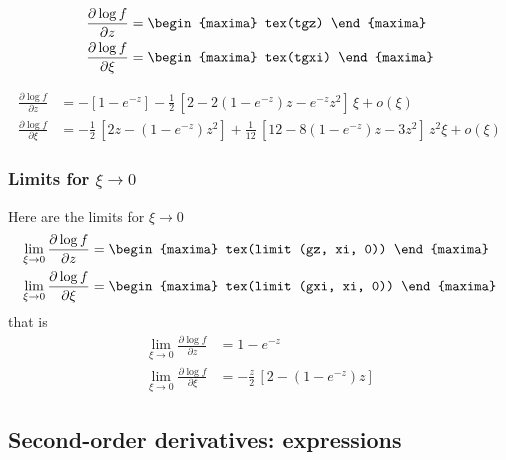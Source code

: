 {\color{MonVertF}
\begin{align*}
  \frac{\partial \log f}{\partial z} &= 
  \begin{maxima}
    tex(tgz)
  \end{maxima} \\
  \frac{\partial \log f}{\partial \xi} &= 
  \begin{maxima}
    tex(tgxi)
  \end{maxima}
\end{align*}
}

{\color{red}
\begin{align*}
\frac{\partial \log f}{\partial z} &= -\left[ 1 - e^{-z} \right]
- \frac{1}{2}\, \left[2 -2 (1 - e^{-z}) z -  e^{-z} z^2 \right] \, \xi + o(\xi)  \\
\frac{\partial \log f}{\partial \xi} &= -\frac{1}{2}\,\left[ 2 z - (1 - e^{-z}) z^2 \right]
+  \frac{1}{12}\, \left[12 - 8 (1 - e^{-z}) z - 3z^2\right] \, z^2 \xi + o(\xi) 
\end{align*}
}

\subsubsection*{Limits for $\xi \to 0$}
Here are the limits for $\xi \to 0$
{\color{MonVertF}
  \begin{align*}
  \lim_{\xi \to 0} \frac{\partial \log f}{\partial z}
  &=
    \begin{maxima}
      tex(limit (gz, xi, 0))
    \end{maxima}
  \\
  \lim_{\xi \to 0} \frac{\partial \log f}{\partial \xi}
  &=
    \begin{maxima}
      tex(limit (gxi, xi, 0))
    \end{maxima}
\end{align*}}
that is
{\color{red}
  \begin{align*}
  \lim_{\xi \to 0} \frac{\partial \log f}{\partial z}
  &= 1 - e^{-z}
  \\
  \lim_{\xi \to 0} \frac{\partial \log f}{\partial \xi}
  &= -\frac{z}{2} \,\left[2 - (1 - e^{-z}) z \right] 
\end{align*}}



\subsection{Second-order derivatives: expressions}
